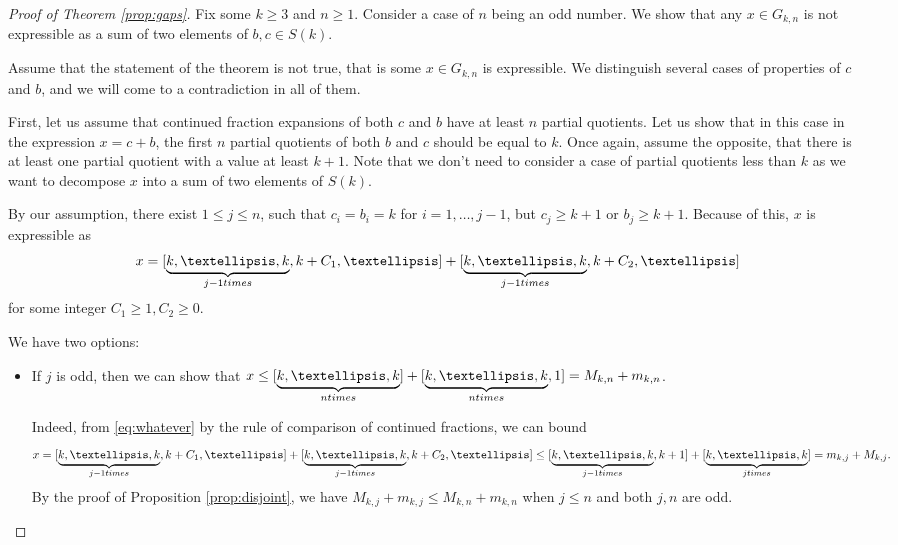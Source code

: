 \documentclass{amsart}
\theoremstyle{definition}
\newcommand{\0}{\mbf 0}%
\renewcommand{\text}{\textup}
\begin{document}
\begin{proof}[Proof of Theorem \ref{prop:gaps}]
Fix some $k\geq3$ and $n\geq1$.  Consider a case of $n$ being an odd number. We show that any $x\in G_{k,n}$ is not expressible as a sum of two elements of $b,c\in S(k)$.


Assume that the statement of the theorem is not true, that is some $x\in G_{k,n}$ is expressible. We distinguish several cases of properties of $c$ and $b$, and we will come to a contradiction in all of them. 

First, let us assume that continued fraction expansions of both $c$ and $b$ have at least $n$ partial quotients. Let us show that in this case in the expression $x=c+b$, the first $n$ partial quotients of both $b$ and $c$ should be equal to $k$. Once again, assume the opposite, that there is at least one partial quotient with a value at least $k+1$. Note that we don't need to consider a case of partial quotients less than $k$ as we want to decompose $x$ into a sum of two elements of $S(k)$.

By our assumption, there exist $1\leq j \leq n$,  such that $c_i=b_i=k$ for $i=1,\ldots,j-1$, but $c_j\geq k+1$ or $b_j\geq k+1$. Because of this, $x$ is expressible as
\begin{equation}\label{eq:whatever}
x = [\underbrace{k,\ldots,k}_{j-1 \text{ times }},k+C_1,\ldots] + [\underbrace{k,\ldots,k}_{j-1 \text{ times }},k+C_2,\ldots]
\end{equation}
for some integer $C_1\geq1,C_2\geq0$.

We have two options:
\begin{itemize}
    \item If $j$ is odd, then we can show that $x\leq [\underbrace{k,\ldots,k}_{n \text{ times }}] + [\underbrace{k,\ldots,k}_{n \text{ times }},1]=M_{k,n}+m_{k,n}$.

Indeed, from \eqref{eq:whatever} by the rule of comparison of continued fractions, we can bound 
$$
x =[\underbrace{k,\ldots,k}_{j-1 \text{ times }},k+C_1,\ldots] + [\underbrace{k,\ldots,k}_{j-1 \text{ times }},k+C_2,\ldots] \leq [\underbrace{k,\ldots,k}_{j-1 \text{ times }},k+1] + [\underbrace{k,\ldots,k}_{j \text{ times }}]= m_{k,j}+M_{k,j}.
$$
By the proof of Proposition \ref{prop:disjoint}, we have $M_{k,j}+m_{k,j} \leq M_{k,n}+m_{k,n}$ when $j\leq n$ and both $j,n$ are odd.


\end{itemize}
\end{proof}
\end{document}
